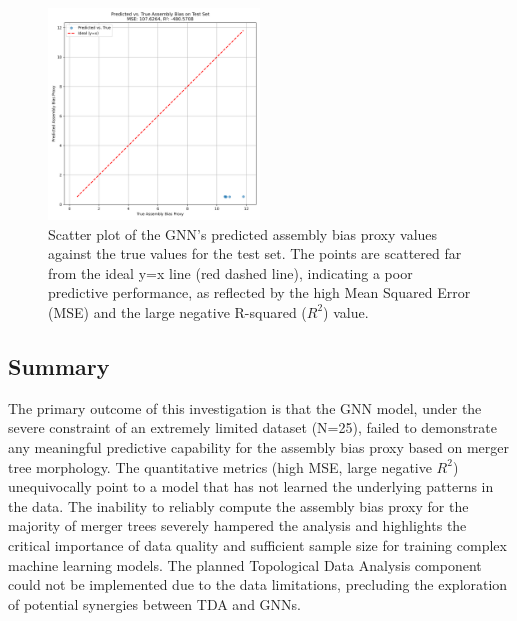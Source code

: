 \documentclass[twocolumn]{aastex631}
\begin{document}
\begin{figure}[htbp]
    \centering
    \includegraphics[width=0.5\textwidth]{../input_files/plots/predicted_vs_true_bias_plot_2_1748137938.png}
    \caption{\label{fig:predicted_vs_true}Scatter plot of the GNN's predicted assembly bias proxy values against the true values for the test set. The points are scattered far from the ideal y=x line (red dashed line), indicating a poor predictive performance, as reflected by the high Mean Squared Error (MSE) and the large negative R-squared ($R^2$) value.}
\end{figure}

\subsection{Summary}

The primary outcome of this investigation is that the GNN model, under the severe constraint of an extremely limited dataset (N=25), failed to demonstrate any meaningful predictive capability for the assembly bias proxy based on merger tree morphology. The quantitative metrics (high MSE, large negative $R^2$) unequivocally point to a model that has not learned the underlying patterns in the data. The inability to reliably compute the assembly bias proxy for the majority of merger trees severely hampered the analysis and highlights the critical importance of data quality and sufficient sample size for training complex machine learning models. The planned Topological Data Analysis component could not be implemented due to the data limitations, precluding the exploration of potential synergies between TDA and GNNs.
\end{document}
